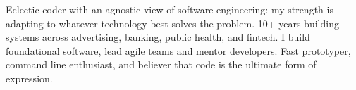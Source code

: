 %
%
%
\par{
Eclectic coder with an agnostic view of software engineering: my strength is adapting to whatever technology best solves the problem. 10+ years building systems across advertising, banking, public health, and fintech. I build foundational software, lead agile teams and mentor developers. Fast prototyper, command line enthusiast, and believer that code is the ultimate form of expression.
}